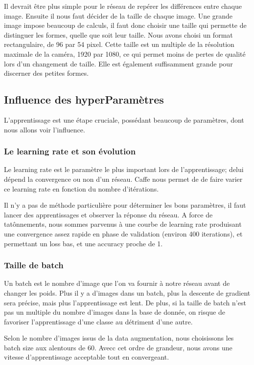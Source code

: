 \documentclass[a4paper,12pt]{article}
\begin{document}
    Il devrait être plus simple pour le réseau de repérer les différences entre chaque image.
    Ensuite il nous faut décider de la taille de chaque image. Une grande image impose beaucoup de calculs, il faut donc choisir une taille qui permette de distinguer les formes, quelle que soit leur taille. Nous avons choisi un format rectangulaire, de 96 par 54 pixel. Cette taille est un multiple de la résolution maximale de la caméra, 1920 par 1080, ce qui permet moins de pertes de qualité lors d'un changement de taille. Elle est également suffisamment grande pour discerner des petites formes.
    
  \subsection{Influence des hyperParamètres}
    L'apprentissage est une étape cruciale, possédant beaucoup de paramètres, dont nous allons voir l'influence.
    \subsubsection{Le learning rate et son évolution}
      Le learning rate est le paramètre le plus important lors de l'apprentissage; delui dépend la convergence ou non d'un réseau. Caffe nous permet de de faire varier ce learning rate en fonction du nombre d'itérations.

      Il n'y a pas de méthode particulière pour déterminer les bons paramètres, il faut lancer des apprentissages et observer la réponse du réseau. A force de tatônnements, nous sommes parvenus à une courbe de learning rate produisant une convergence assez rapide en phase de validation (environ 400 iterations), et permettant un loss bas, et une accuracy proche de 1.

    \subsubsection{Taille de batch}
      Un batch est le nombre d'image que l'on va fournir à notre réseau avant de changer les poids. Plus il y a d'images dans un batch, plus la descente de gradient sera précise, mais plus l'apprentissage est lent. De plus, si la taille de batch n'est pas un multiple du nombre d'images dans la base de donnée, on risque de favoriser l'apprentissage d'une classe au détriment d'une autre. 

      Selon le nombre d'images issus de la data augmentation, nous choisissons les batch size aux alentours de 60. Avecc cet ordre de grandeur, nous avons une vitesse d'apprentissage acceptable tout en convergeant.
\end{document}
